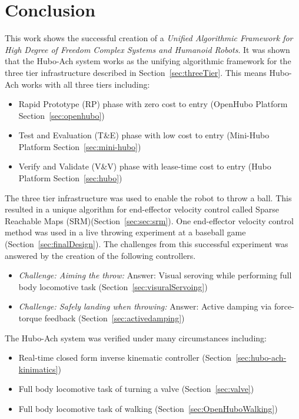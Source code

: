 \chapter{Conclusion}\label{sec:conclusion}
This work shows the successful creation of a \textit{Unified Algorithmic Framework for High Degree of Freedom Complex Systems and Humanoid Robots}.
It was shown that the Hubo-Ach system works as the unifying algorithmic framework for the three tier infrastructure described in Section~\ref{sec:threeTier}.
This means Hubo-Ach works with all three tiers including:
\begin{itemize}
\item Rapid Prototype (RP) phase with zero cost to entry (OpenHubo Platform Section~\ref{sec:openhubo})
\item Test and Evaluation (T\&E) phase with low cost to entry (Mini-Hubo Platform Section~\ref{sec:mini-hubo})
\item Verify and Validate (V\&V) phase with lease-time cost to entry (Hubo Platform Section~\ref{sec:hubo})
\end{itemize}

The three tier infrastructure was used to enable the robot to throw a ball.
This resulted in a unique algorithm for end-effector velocity control called Sparse Reachable Maps (SRM)(Section~\ref{sec:sec:srm}).
One end-effector velocity control method was used in a live throwing experiment at a baseball game (Section~\ref{sec:finalDesign}).
The challenges from this successful experiment was answered by the creation of the following controllers.
\begin{itemize}
	\item \textit{Challenge: Aiming the throw:} Answer: Visual seroving while performing full body locomotive task (Section~\ref{sec:visuralServoing})
	\item \textit{Challenge: Safely landing when throwing:} Answer: Active damping via force-torque feedback (Section~\ref{sec:activedamping})
\end{itemize}


The Hubo-Ach system was verified under many circumstances including:
\begin{itemize}
	\item Real-time closed form inverse kinematic controller (Section~\ref{sec:hubo-ach-kinimatics})
	\item Full body locomotive task of turning a valve (Section~\ref{sec:valve})
	\item Full body locomotive task of walking (Section~\ref{sec:OpenHuboWalking})
\end{itemize}

